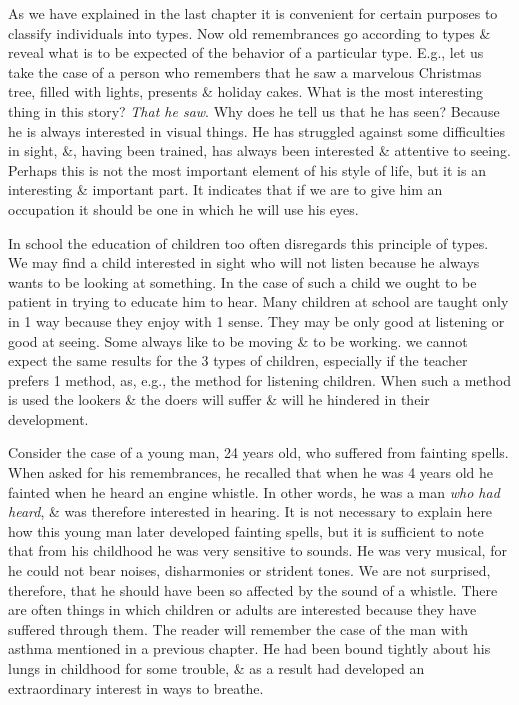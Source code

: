 \documentclass{article}
\begin{document}
As we have explained in the last chapter it is convenient for certain purposes to classify individuals into types. Now old remembrances go according to types \& reveal what is to be expected of the behavior of a particular type. E.g., let us take the case of a person who remembers that he saw a marvelous Christmas tree, filled with lights, presents \& holiday cakes. What is the most interesting thing in this story? \textit{That he saw}. Why does he tell us that he has seen? Because he is always interested in visual things. He has struggled against some difficulties in sight, \&, having been trained, has always been interested \& attentive to seeing. Perhaps this is not the most important element of his style of life, but it is an interesting \& important part. It indicates that if we are to give him an occupation it should be one in which he will use his eyes.

In school the education of children too often disregards this principle of types. We may find a child interested in sight who will not listen because he always wants to be looking at something. In the case of such a child we ought to be patient in trying to educate him to hear. Many children at school are taught only in 1 way because they enjoy with 1 sense. They may be only good at listening or good at seeing. Some always like to be moving \& to be working. we cannot expect the same results for the 3 types of children, especially if the teacher prefers 1 method, as, e.g., the method for listening children. When such a method is used the lookers \& the doers will suffer \& will he hindered in their development.

Consider the case of a young man, 24 years old, who suffered from fainting spells. When asked for his remembrances, he recalled that when he was 4 years old he fainted when he heard an engine whistle. In other words, he was a man \textit{who had heard}, \& was therefore interested in hearing. It is not necessary to explain here how this young man later developed fainting spells, but it is sufficient to note that from his childhood he was very sensitive to sounds. He was very musical, for he could not bear noises, disharmonies or strident tones. We are not surprised, therefore, that he should have been so affected by the sound of a whistle. There are often things in which children or adults are interested because they have suffered through them. The reader will remember the case of the man with asthma mentioned in a previous chapter. He had been bound tightly about his lungs in childhood for some trouble, \& as a result had developed an extraordinary interest in ways to breathe.
\end{document}
